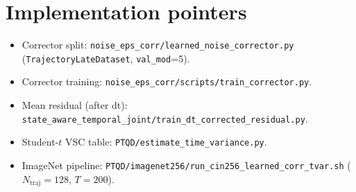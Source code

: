 \documentclass[11pt]{article}
\newcommand{\valmod}{\texttt{val\_mod}=5}
\begin{document}
\section*{Implementation pointers}
\begin{itemize}[leftmargin=*]
  \item Corrector split: \texttt{noise\_eps\_corr/learned\_noise\_corrector.py} (\texttt{TrajectoryLateDataset}, \valmod).
  \item Corrector training: \texttt{noise\_eps\_corr/scripts/train\_corrector.py}.
  \item Mean residual (after dt): \texttt{state\_aware\_temporal\_joint/train\_dt\_corrected\_residual.py}.
  \item Student-$t$ VSC table: \texttt{PTQD/estimate\_time\_variance.py}.
  \item ImageNet pipeline: \texttt{PTQD/imagenet256/run\_cin256\_learned\_corr\_tvar.sh} ($N_{\mathrm{traj}}{=}128$, $T{=}200$).
\end{itemize}
\end{document}
